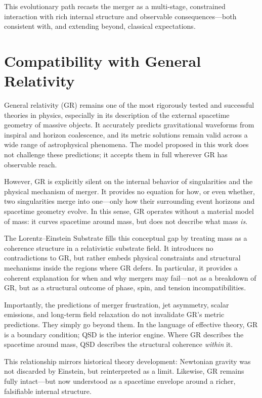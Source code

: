 \documentclass[sn-mathphys]{sn-jnl}
\theoremstyle{thmstyleone}%
\theoremstyle{thmstyletwo}%
\theoremstyle{thmstylethree}%
\begin{document}
This evolutionary path recasts the merger as a multi-stage, constrained interaction with rich internal structure and observable consequences—both consistent with, and extending beyond, classical expectations.

\section{Compatibility with General Relativity}

General relativity (GR) remains one of the most rigorously tested and successful theories in physics, especially in its description of the external spacetime geometry of massive objects. It accurately predicts gravitational waveforms from inspiral and horizon coalescence, and its metric solutions remain valid across a wide range of astrophysical phenomena. The model proposed in this work does not challenge these predictions; it accepts them in full wherever GR has observable reach.

However, GR is explicitly silent on the internal behavior of singularities\cite{Penrose1965} and the physical mechanism of merger. It provides no equation for how, or even whether, two singularities merge into one—only how their surrounding event horizons and spacetime geometry evolve. In this sense, GR operates without a material model of mass: it curves spacetime around mass, but does not describe what mass \textit{is}.

The Lorentz--Einstein Substrate fills this conceptual gap by treating mass as a coherence structure in a relativistic substrate field. It introduces no contradictions to GR, but rather embeds physical constraints and structural mechanisms inside the regions where GR defers. In particular, it provides a coherent explanation for when and why mergers may fail—not as a breakdown of GR, but as a structural outcome of phase, spin, and tension incompatibilities.

Importantly, the predictions of merger frustration, jet asymmetry, scalar emissions, and long-term field relaxation do not invalidate GR’s metric predictions. They simply go beyond them. In the language of effective theory, GR is a boundary condition; QSD is the interior engine. Where GR describes the spacetime around mass, QSD describes the structural coherence \textit{within} it.

This relationship mirrors historical theory development: Newtonian gravity was not discarded by Einstein, but reinterpreted as a limit. Likewise, GR remains fully intact—but now understood as a spacetime envelope around a richer, falsifiable internal structure.
\end{document}
